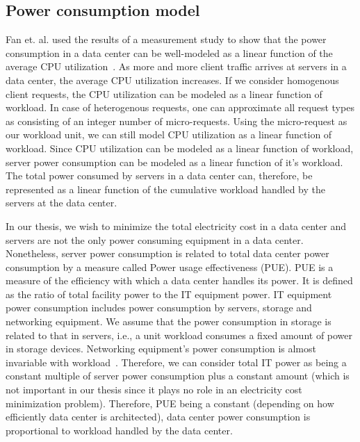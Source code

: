 \subsection{Power consumption model} 
Fan et. al. used the results of a measurement study to show that the power consumption in a data center can be well-modeled as a linear function of the average CPU utilization~\cite{Fan:power:ICSA:2007}. As more and more client traffic arrives at servers in a data center, the average CPU utilization increases. If we consider homogenous client requests, the CPU utilization can be modeled as a linear function of workload. In case of heterogenous requests, one can approximate all request types as consisting of an integer number of micro-requests. Using the micro-request as our workload unit, we can still model CPU utilization as a linear function of workload. Since CPU utilization can be modeled as a linear function of workload, server power consumption can be modeled as a linear function of it's workload. The total power consumed by servers in a data center can, therefore, be represented as a linear function of the cumulative workload handled by the servers at the data center.


In our thesis, we wish to minimize the total electricity cost in a data center and servers are not the only power consuming equipment in a data center. Nonetheless, server power consumption is related to total data center power consumption by a measure called Power usage effectiveness (PUE). PUE is a measure of the efficiency with which a data center handles its power. It is defined as the ratio of total facility power to the IT equipment power. IT equipment power consumption includes power consumption by servers, storage and networking equipment. We assume that the power consumption in storage is related to that in servers, i.e., a unit workload consumes a fixed amount of power in storage devices. Networking equipment's power consumption is almost invariable with workload~\cite{Mahadevan:2009:PBF:1560132.1560210,Vishwanath:13,Chabarek08powerawareness}. Therefore, we can consider total IT power as being a constant multiple of server power consumption plus a constant amount (which is not important in our thesis since it plays no role in an electricity cost minimization problem). Therefore, PUE being a constant (depending on how efficiently data center is architected), data center power consumption is proportional to workload handled by the data center.

